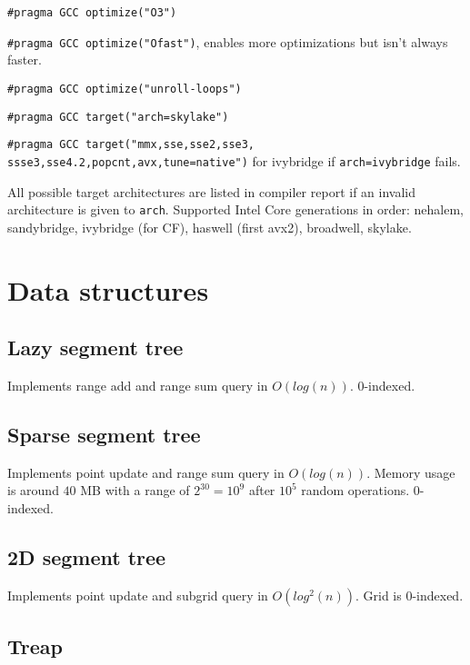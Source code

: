 \documentclass{article}
\begin{document}
\texttt{\#pragma GCC optimize("O3")}

\texttt{\#pragma GCC optimize("Ofast")}, enables more optimizations but isn't always faster.

\texttt{\#pragma GCC optimize("unroll-loops")}

\texttt{\#pragma GCC target("arch=skylake")}

\texttt{\#pragma GCC target("mmx,sse,sse2,sse3,\\ssse3,sse4.2,popcnt,avx,tune=native")} for ivybridge if \texttt{arch=ivybridge} fails.

All possible target architectures are listed in compiler report if an invalid architecture is given to \texttt{arch}. Supported Intel Core generations in order: nehalem, sandybridge, ivybridge (for CF), haswell (first avx2), broadwell, skylake.

\section{Data structures}

\subsection{Lazy segment tree}

Implements range add and range sum query in $O(log(n))$. $0$-indexed.



\subsection {Sparse segment tree}

Implements point update and range sum query in $O(log(n))$. Memory usage is around $40$ MB with a range of $2^{30} = 10^9$ after $10^5$ random operations. $0$-indexed.



\subsection {2D segment tree}

Implements point update and subgrid query in $O(log^2(n))$. Grid is $0$-indexed.



\subsection {Treap}
\end{document}
